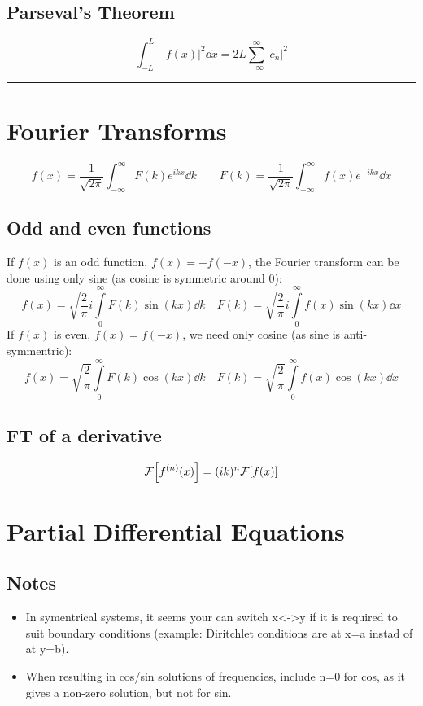 \documentclass[10pt,a4paper]{article}
\renewcommand{\exp}{e^}
\newcommand{\infint}{\int_{-\infty}^{\infty}}
\newcommand{\holine}{\rule{286pt}{1pt}}
\begin{document}
\begin{multicols}{2}
\subsection*{Parseval's Theorem}
\[
    \int_{-L}^L |f(x)|^2 \dd{x} = 2L\sum_{-\infty}^\infty |c_n|^2
\]



\holine
\section*{Fourier Transforms}
\[
    f(x) = \frac{1}{\sqrt{2\pi}} \infint F(k) \exp{ikx} \dd{k} \quad\quad
    F(k) = \frac{1}{\sqrt{2\pi}} \infint f(x) \exp{-ikx} \dd{x}
\]

\subsection*{Odd and even functions}
If $f(x)$ is an odd function, $f(x) = -f(-x)$, the Fourier transform can be done using only sine (as cosine is symmetric around 0):
\[
    f(x) = \sqrt{\frac{2}{\pi}} i\int\limits_0^{\infty} F(k) \sin(k x) \dd{k}   \quad
    F(k) = \sqrt{\frac{2}{\pi}} i\int\limits_0^{\infty} f(x) \sin(k x) \dd{x}
\]
If $f(x)$ is even, $f(x) = f(-x)$, we need only cosine (as sine is anti-symmentric):
\[
    f(x) = \sqrt{\frac{2}{\pi}} \int\limits_0^{\infty} F(k) \cos(k x) \dd{k}   \quad
    F(k) = \sqrt{\frac{2}{\pi}} \int\limits_0^{\infty} f(x) \cos(k x) \dd{x}
\]


\subsection*{FT of a derivative}
\[
    \mathcal{F}\qty[f^{(n)}(x)] = (ik)^n \mathcal{F}\qty[f(x)]
\]


    




\newpage
\section*{Partial Differential Equations}
\subsection*{Notes}
\begin{itemize}
    \item In symentrical systems, it seems your can switch x<->y if it is required to suit boundary conditions (example: Diritchlet conditions are at x=a instad of at y=b).
    \item When resulting in cos/sin solutions of frequencies, include n=0 for cos, as it gives a non-zero solution, but not for sin.
\end{itemize}


\end{multicols}
\end{document}
